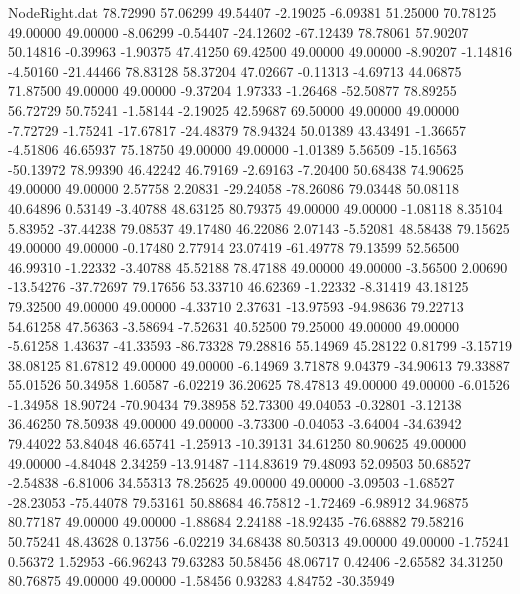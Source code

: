 \begin{filecontents}{NodeRight.dat}
  78.72990   57.06299   49.54407    -2.19025   -6.09381   51.25000   70.78125   49.00000   49.00000   -8.06299   -0.54407  -24.12602  -67.12439
  78.78061   57.90207   50.14816    -0.39963   -1.90375   47.41250   69.42500   49.00000   49.00000   -8.90207   -1.14816   -4.50160  -21.44466
  78.83128   58.37204   47.02667    -0.11313   -4.69713   44.06875   71.87500   49.00000   49.00000   -9.37204    1.97333   -1.26468  -52.50877
  78.89255   56.72729   50.75241    -1.58144   -2.19025   42.59687   69.50000   49.00000   49.00000   -7.72729   -1.75241  -17.67817  -24.48379
  78.94324   50.01389   43.43491    -1.36657   -4.51806   46.65937   75.18750   49.00000   49.00000   -1.01389    5.56509  -15.16563  -50.13972
  78.99390   46.42242   46.79169    -2.69163   -7.20400   50.68438   74.90625   49.00000   49.00000    2.57758    2.20831  -29.24058  -78.26086
  79.03448   50.08118   40.64896     0.53149   -3.40788   48.63125   80.79375   49.00000   49.00000   -1.08118    8.35104    5.83952  -37.44238
  79.08537   49.17480   46.22086     2.07143   -5.52081   48.58438   79.15625   49.00000   49.00000   -0.17480    2.77914   23.07419  -61.49778
  79.13599   52.56500   46.99310    -1.22332   -3.40788   45.52188   78.47188   49.00000   49.00000   -3.56500    2.00690  -13.54276  -37.72697
  79.17656   53.33710   46.62369    -1.22332   -8.31419   43.18125   79.32500   49.00000   49.00000   -4.33710    2.37631  -13.97593  -94.98636
  79.22713   54.61258   47.56363    -3.58694   -7.52631   40.52500   79.25000   49.00000   49.00000   -5.61258    1.43637  -41.33593  -86.73328
  79.28816   55.14969   45.28122     0.81799   -3.15719   38.08125   81.67812   49.00000   49.00000   -6.14969    3.71878    9.04379  -34.90613
  79.33887   55.01526   50.34958     1.60587   -6.02219   36.20625   78.47813   49.00000   49.00000   -6.01526   -1.34958   18.90724  -70.90434
  79.38958   52.73300   49.04053    -0.32801   -3.12138   36.46250   78.50938   49.00000   49.00000   -3.73300   -0.04053   -3.64004  -34.63942
  79.44022   53.84048   46.65741    -1.25913  -10.39131   34.61250   80.90625   49.00000   49.00000   -4.84048    2.34259  -13.91487 -114.83619
  79.48093   52.09503   50.68527    -2.54838   -6.81006   34.55313   78.25625   49.00000   49.00000   -3.09503   -1.68527  -28.23053  -75.44078
  79.53161   50.88684   46.75812    -1.72469   -6.98912   34.96875   80.77187   49.00000   49.00000   -1.88684    2.24188  -18.92435  -76.68882
  79.58216   50.75241   48.43628     0.13756   -6.02219   34.68438   80.50313   49.00000   49.00000   -1.75241    0.56372    1.52953  -66.96243
  79.63283   50.58456   48.06717     0.42406   -2.65582   34.31250   80.76875   49.00000   49.00000   -1.58456    0.93283    4.84752  -30.35949

\end{filecontents}
